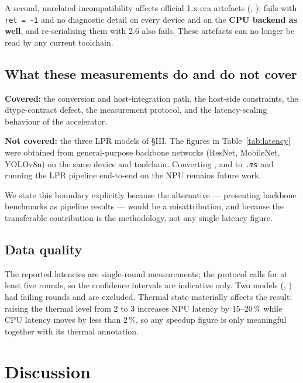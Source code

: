 \documentclass[journal]{IEEEtran}
\begin{document}
A second, unrelated incompatibility affects official 1.x-era artefacts
(, ):
 fails with \texttt{ret = -1} and no
diagnostic detail on every device and on the \textbf{CPU backend as well}, and
re-serialising them with  2.6 also fails. These artefacts
can no longer be read by any current toolchain.

\subsection{What these measurements do and do not cover}

\textbf{Covered:} the conversion and host-integration path, the host-side
constraints, the dtype-contract defect, the measurement protocol, and the
latency-scaling behaviour of the accelerator.

\textbf{Not covered:} the three LPR models of \S III. The figures in
Table~\ref{tab:latency} were obtained from general-purpose backbone networks
(ResNet, MobileNet, YOLOv8n) on the same device and toolchain. Converting
,  and
 to \texttt{.ms} and running the LPR pipeline
end-to-end on the NPU remains future work.

We state this boundary explicitly because the alternative --- presenting backbone
benchmarks as pipeline results --- would be a misattribution, and because the
transferable contribution is the methodology, not any single latency figure.

\subsection{Data quality}

The reported latencies are single-round measurements; the protocol calls for at
least five rounds, so the confidence intervals are indicative only. Two models
(, ) had failing rounds
and are excluded. Thermal state materially affects the result: raising the
thermal level from 2 to 3 increases NPU latency by 15--20\,\% while CPU latency
moves by less than 2\,\%, so any speedup figure is only meaningful together with
its thermal annotation.

\section{Discussion}
\end{document}
